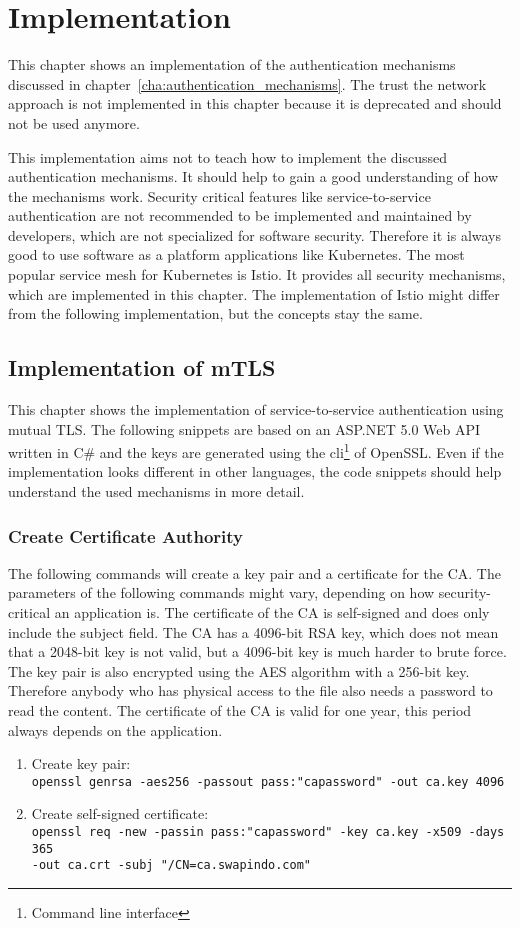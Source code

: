 \chapter{Implementation}
\label{cha:Implementation}
This chapter shows an implementation of the authentication mechanisms discussed in chapter~\ref{cha:authentication_mechanisms}.
The trust the network approach is not implemented in this chapter because it is deprecated and should not be used anymore. 

This implementation aims not to teach how to implement the discussed authentication mechanisms. It should help to gain a good understanding of how the mechanisms work.
Security critical features like service-to-service authentication are not recommended to be implemented and maintained by developers, which are not specialized for software security.
Therefore it is always good to use software as a platform applications like Kubernetes.
The most popular service mesh for Kubernetes is Istio.
It provides all security mechanisms, which are implemented in this chapter.
The implementation of Istio might differ from the following implementation, but the concepts stay the same.

\section{Implementation of mTLS}
This chapter shows the implementation of service-to-service authentication using mutual TLS. 
The following snippets are based on an ASP.NET 5.0 Web API written in C\# and the keys are generated using the cli\footnote{Command line interface} of OpenSSL.
Even if the implementation looks different in other languages, the code snippets should help understand the used mechanisms in more detail.

\subsection{Create Certificate Authority}
The following commands will create a key pair and a certificate for the CA.
The parameters of the following commands might vary, depending on how security-critical an application is.
The certificate of the CA is self-signed and does only include the subject field.
The CA has a 4096-bit RSA key, which does not mean that a 2048-bit key is not valid, but a 4096-bit key is much harder to brute force.
The key pair is also encrypted using the AES algorithm with a 256-bit key. Therefore anybody who has physical access to the file also needs a password to read the content.
The certificate of the CA is valid for one year, this period always depends on the application.
\begin{enumerate}
    \item Create key pair: \\ 
    \lstinline{openssl genrsa -aes256 -passout pass:"capassword" -out ca.key 4096}
    \item Create self-signed certificate: \\
    \lstinline{openssl req -new -passin pass:"capassword" -key ca.key -x509 -days 365} \\
    \lstinline{-out ca.crt -subj "/CN=ca.swapindo.com"}
\end{enumerate}

